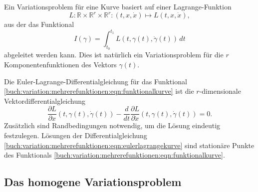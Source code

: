 Ein Variationsproblem für eine Kurve basiert auf einer Lagrange-Funktion
\[
L
\colon
\mathbb{R}\times\mathbb{R}^r\times\mathbb{R}^r
:
(t,x,\dot{x})
\mapsto
L(t,x,\dot{x}),
\]
aus der das Funktional
\begin{equation}
I(\gamma)
=
\int_{t_0}^{t_1}
L(t,\gamma(t),\dot{\gamma}(t))
\,dt
\label{buch:variation:mehrerefunktionen:eqn:funktionalkurve}
\end{equation}
abgeleitet werden kann.
Dies ist natürlich ein Variationsproblem für die $r$ Komponentenfunktionen
des Vektors $\gamma(t)$.

Die Euler-Lagrange-Differentialgleichung für das Funktional
\eqref{buch:variation:mehrerefunktionen:eqn:funktionalkurve}
ist die $r$-dimensionale Vektordifferentialgleichung
\begin{equation}
\frac{\partial L}{\partial x}(t,\gamma(t), \dot{\gamma}(t))
-
\frac{d}{dt}
\frac{\partial L}{\partial \dot{x}}(t,\gamma(t),\dot{\gamma}(t))
=
0.
\label{buch:variation:mehrerefunktionen:eqn:eulerlagrangekurve}
\end{equation}
Zusätzlich sind Randbedingungen notwendig, um die Lösung 
eindeutig festzulegen.
Lösungen der Differentialgleichung
\eqref{buch:variation:mehrerefunktionen:eqn:eulerlagrangekurve}
sind stationäre Punkte des Funktionals
\eqref{buch:variation:mehrerefunktionen:eqn:funktionalkurve}.

%
%
\subsection{Das homogene Variationsproblem
\label{buch:variation:mehrerefunktionen:subsection:homogen}}







